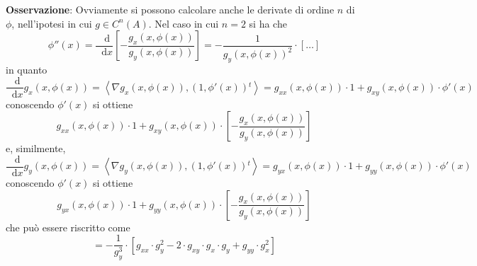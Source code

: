 \documentclass[a4paper]{extarticle}
\newcommand*\dif{\mathop{}\!\mathrm{d}}
\begin{document}
\vspace{1em}
\noindent
\textbf{Osservazione}: Ovviamente si possono calcolare anche le derivate di ordine $n$ di $\phi$, nell'ipotesi in cui $g \in C^n(A)$. Nel caso in cui $n=2$ si ha che
\[\phi''(x) = \dfrac{\dif}{\dif x} \left[- \dfrac{g_x(x,\phi(x))}{g_y(x,\phi(x))}\right] = - \dfrac{1}{g_y(x,\phi(x))^2} \cdot \left[\dots\right]\]
in quanto
\[\dfrac{\dif }{\dif x} g_x(x,\phi(x)) = \left<\nabla g_x(x,\phi(x)), (1,\phi'(x)){^t}\right> = g_{xx}(x,\phi(x)) \cdot 1 + g_{xy} (x,\phi(x)) \cdot \phi'(x)\]
conoscendo $\phi'(x)$ si ottiene
\[g_{xx}(x,\phi(x)) \cdot 1 + g_{xy} (x,\phi(x)) \cdot \left[- \dfrac{g_x(x,\phi(x))}{g_y(x,\phi(x))}\right]\]
e, similmente,
\[\dfrac{\dif }{\dif x} g_y(x,\phi(x)) = \left<\nabla g_y(x,\phi(x)), (1,\phi'(x)){^t}\right> = g_{yx}(x,\phi(x)) \cdot 1 + g_{yy} (x,\phi(x)) \cdot \phi'(x)\]
conoscendo $\phi'(x)$ si ottiene
\[g_{yx}(x,\phi(x)) \cdot 1 + g_{yy} (x,\phi(x)) \cdot \left[- \dfrac{g_x(x,\phi(x))}{g_y(x,\phi(x))}\right]\]
che può essere riscritto come
\[=-\dfrac{1}{g_y^3} \cdot \left[g_{xx} \cdot g_y^2 - 2 \cdot g_{xy} \cdot g_x \cdot g_y + g_{yy} \cdot g_x^2\right]\]
\end{document}
